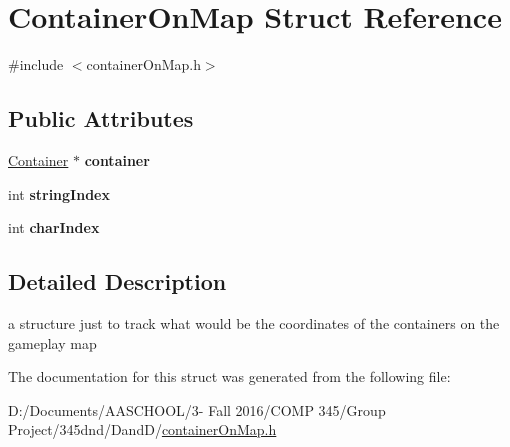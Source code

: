 \hypertarget{struct_container_on_map}{}\section{Container\+On\+Map Struct Reference}
\label{struct_container_on_map}


{\ttfamily \#include $<$container\+On\+Map.\+h$>$}

\subsection*{Public Attributes}
\begin{DoxyCompactItemize}
\item 
\hypertarget{struct_container_on_map_ae1df8d0f0675cf981e411cca41f03913}{}\label{struct_container_on_map_ae1df8d0f0675cf981e411cca41f03913} 
\hyperlink{class_container}{Container} $\ast$ {\bfseries container}
\item 
\hypertarget{struct_container_on_map_af0cec419059f87b45ab740fb9eaefd4a}{}\label{struct_container_on_map_af0cec419059f87b45ab740fb9eaefd4a} 
int {\bfseries string\+Index}
\item 
\hypertarget{struct_container_on_map_a87852d390130c8c650880fea7bedb11f}{}\label{struct_container_on_map_a87852d390130c8c650880fea7bedb11f} 
int {\bfseries char\+Index}
\end{DoxyCompactItemize}


\subsection{Detailed Description}
a structure just to track what would be the coordinates of the containers on the gameplay map 

The documentation for this struct was generated from the following file\+:\begin{DoxyCompactItemize}
\item 
D\+:/\+Documents/\+A\+A\+S\+C\+H\+O\+O\+L/3-\/ Fall 2016/\+C\+O\+M\+P 345/\+Group Project/345dnd/\+Dand\+D/\hyperlink{container_on_map_8h}{container\+On\+Map.\+h}\end{DoxyCompactItemize}
